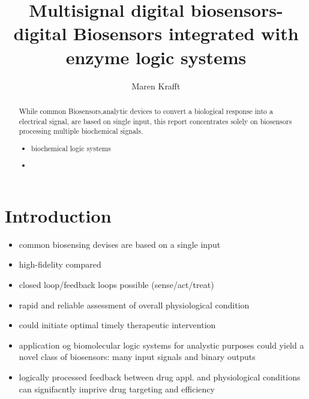 \documentclass[runningheads]{llncs}
\begin{document}
\title{Multisignal digital biosensors- digital Biosensors integrated with enzyme logic systems}
\author{Maren Krafft}
\maketitle        

      
\begin{abstract}
	
While common Biosensors,analytic devices to convert a biological response into a electrical signal, are based on single input, this report concentrates solely on biosensors processing multiple biochemical signals. 
\begin{itemize}
	\item biochemical logic systems
	\item 
\end{itemize}



\end{abstract}

\section{Introduction}
	\begin{itemize}
		\item common biosensing devises are based on a single input 
		\item high-fidelity compared
		\item closed loop/feedback loops possible (sense/act/treat)
		\item rapid and reliable assessment of overall physiological condition
		\item could initiate optimal timely therapeutic intervention
		\item application og biomolecular logic systems for analystic purposes could yield a novel class of biosensors: many input signals and binary outputs
		\item logically processed feedback between drug appl. and physiological conditions can signifacntly imprive drug targeting and efficiency 
	\end{itemize}
\end{document}
